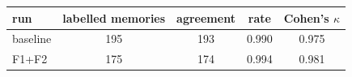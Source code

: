 \begin{tabular}{lcccc}
\toprule
run & labelled memories & agreement & rate & Cohen's $\kappa$ \\
\midrule
baseline & 195 & 193 & 0.990 & 0.975 \\
F1+F2 & 175 & 174 & 0.994 & 0.981 \\
\bottomrule
\end{tabular}
